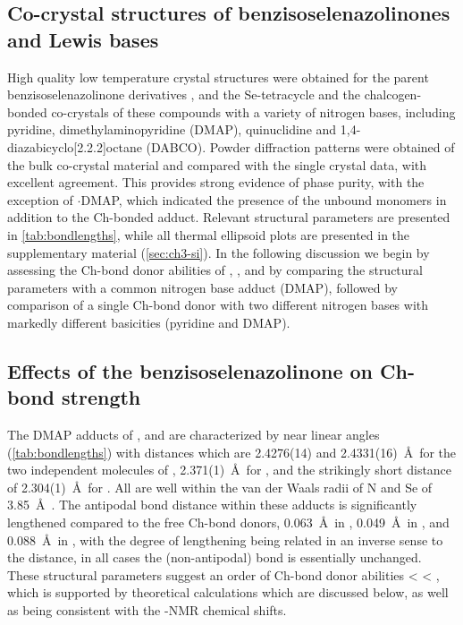 \begin{refsection}
    \subsection{Co-crystal structures of benzisoselenazolinones and Lewis bases}
    High quality low temperature crystal structures were obtained for the parent benzisoselenazolinone derivatives  \autocite{Thomas2015},  and the Se-tetracycle  and the chalcogen-bonded co-crystals of these compounds with a variety of nitrogen bases, including pyridine, dimethylaminopyridine (DMAP), quinuclidine and 1,4-diaza\-bicyclo[2.2.2]\-octane (DABCO).
    Powder diffraction patterns were obtained of the bulk co-crystal material and compared with the single crystal data, with excellent agreement.
    This provides strong evidence of phase purity, with the exception of $ \cdot $DMAP, which indicated the presence of the unbound monomers in addition to the Ch-bonded adduct.
    Relevant structural parameters are presented in \cref{tab:bondlengths}, while all thermal ellipsoid plots are presented in the supplementary material (\cref{sec:ch3-si}).
    In the following discussion we begin by assessing the Ch-bond donor abilities of , , and  by comparing the structural parameters with a common nitrogen base adduct (DMAP), followed by comparison of a single Ch-bond donor  with two different nitrogen bases with markedly different basicities (pyridine and DMAP).
    
    \subsection{Effects of the benzisoselenazolinone on Ch-bond strength}
    The DMAP adducts of ,  and  are characterized by near linear  angles (\cref{tab:bondlengths}) with  distances which are 2.4276(14) and 2.4331(16)~\AA\ for the two independent molecules of , 2.371(1)~\AA\ for , and the strikingly short  distance of 2.304(1)~\AA\ for .
    All are well within the van der Waals radii of N and Se of 3.85~\AA\ \autocite{Batsanov2001}.
    The antipodal  bond distance within these adducts is significantly lengthened compared to the free Ch-bond donors, 0.063~\AA\ in , 0.049~\AA\ in , and 0.088~\AA\ in , with the degree of lengthening being related in an inverse sense to the  distance, in all cases the (non-antipodal)  bond is essentially unchanged.
    These structural parameters suggest an order of Ch-bond donor abilities  <  < , which is supported by theoretical calculations which are discussed below, as well as being consistent with the -NMR chemical shifts.
    

\end{refsection}
